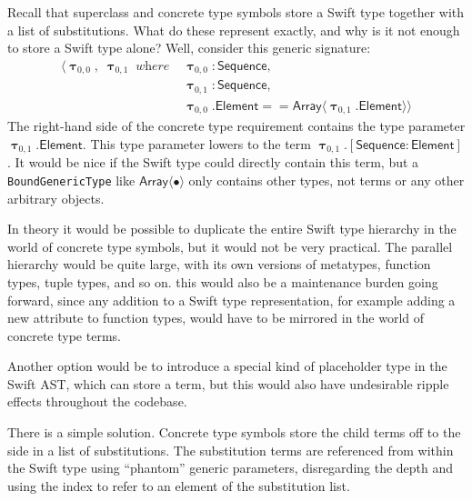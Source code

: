 \documentclass[headsepline,bibliography=totoc]{scrreport}
\newcommand{\namesym}[1]{\mathsf{#1}}
\newcommand{\proto}[1]{\bm{\mathsf{#1}}}
\newcommand{\gensig}[2]{\langle #1\;\textit{where}\;#2\rangle}
\newcommand{\genericsym}[2]{\bm{\uptau}_{#1,#2}}
\newcommand{\assocsym}[2]{[\proto{#1}\colon\namesym{#2}]}
\theoremstyle{definition}
\theoremstyle{definition}
\theoremstyle{definition}
\begin{document}
Recall that superclass and concrete type symbols store a Swift type together with a list of substitutions. What do these represent exactly, and why is it not enough to store a Swift type alone? Well, consider this generic signature:
\begin{align*}
\gensig{\genericsym{0}{0},\;\genericsym{0}{1}}
{
&\genericsym{0}{0}\colon\proto{Sequence},\\
&\genericsym{0}{1}\colon\proto{Sequence},\\
&\genericsym{0}{0}.\namesym{Element}==
\namesym{Array}\langle\genericsym{0}{1}.\namesym{Element}\rangle
}
\end{align*}
The right-hand side of the concrete type requirement contains the type parameter $\genericsym{0}{1}.\namesym{Element}$. This type parameter lowers to the term $\genericsym{0}{1}.\assocsym{Sequence}{Element}$. It would be nice if the Swift type could directly contain this term, but a \texttt{BoundGenericType} like $\namesym{Array}\langle\bullet\rangle$ only contains other types, not terms or any other arbitrary objects.
\begin{leftbar}
\noindent In theory it would be possible to duplicate the entire Swift type hierarchy in the world of concrete type symbols, but it would not be very practical. The parallel hierarchy would be quite large, with its own versions of metatypes, function types, tuple types, and so on. this would also be a maintenance burden going forward, since any addition to a Swift type representation, for example adding a new attribute to function types, would have to be mirrored in the world of concrete type terms.

Another option would be to introduce a special kind of placeholder type in the Swift AST, which can store a term, but this would also have undesirable ripple effects throughout the codebase.
\end{leftbar}
There is a simple solution. Concrete type symbols store the child terms off to the side in a list of substitutions. The substitution terms are referenced from within the Swift type using ``phantom'' generic parameters, disregarding the depth and using the index to refer to an element of the substitution list.
\end{document}
